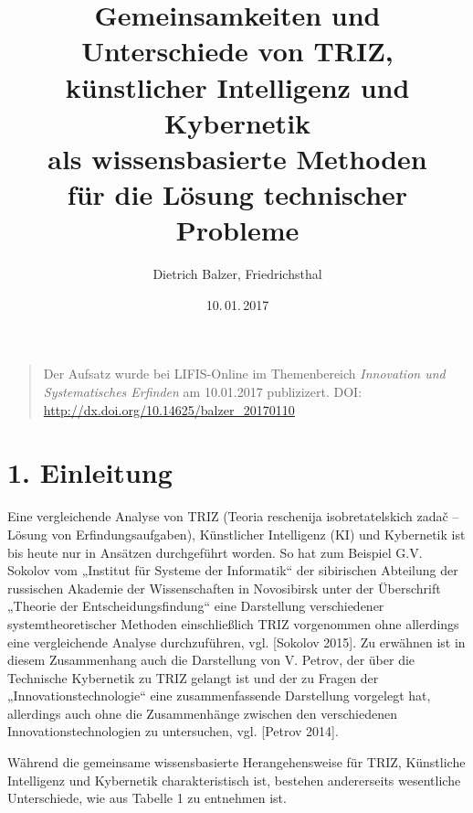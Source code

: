 \documentclass[11pt,a4paper]{article}
\title{Gemeinsamkeiten und Unterschiede von TRIZ,\\ künstlicher
  Intelligenz und Kybernetik\\ als wissensbasierte Methoden\\ für die Lösung
  technischer Probleme}
\author{Dietrich Balzer, Friedrichsthal}
\date{10.\,01.\,2017}
\begin{document}
\maketitle

\begin{quote}
  Der Aufsatz wurde bei LIFIS-Online im Themenbereich \emph{Innovation und
    Systematisches Erfinden} am 10.01.2017 publizizert.  DOI:
  \url{http://dx.doi.org/10.14625/balzer_20170110}
\end{quote}

\section*{1.  Einleitung}

Eine vergleichende Analyse von TRIZ (Teoria reschenija isobretatelskich
zada\v{c} -- Lösung von Erfindungsaufgaben), Künstlicher Intelligenz (KI) und
Kybernetik ist bis heute nur in Ansätzen durchgeführt worden. So hat zum
Beispiel G.V. Sokolov vom „Institut für Systeme der Informatik“ der sibirischen
Abteilung der russischen Akademie der Wissenschaften in Novosibirsk unter der
Überschrift „Theorie der Entscheidungsfindung“ eine Darstellung verschiedener
systemtheoretischer Methoden einschließlich TRIZ vorgenommen ohne allerdings
eine vergleichende Analyse durchzuführen, vgl. [Sokolov 2015]. Zu erwähnen ist
in diesem Zusammenhang auch die Darstellung von V. Petrov, der über die
Technische Kybernetik zu TRIZ gelangt ist und der zu Fragen der
„Innovationstechnologie“ eine zusammenfassende Darstellung vorgelegt hat,
allerdings auch ohne die Zusammenhänge zwischen den verschiedenen
Innovationstechnologien zu untersuchen, vgl. [Petrov 2014].

Während die gemeinsame wissensbasierte Herangehensweise für TRIZ, Künstliche
Intelligenz und Kybernetik charakteristisch ist, bestehen andererseits
wesentliche Unterschiede, wie aus Tabelle 1 zu entnehmen ist.
\end{document}
